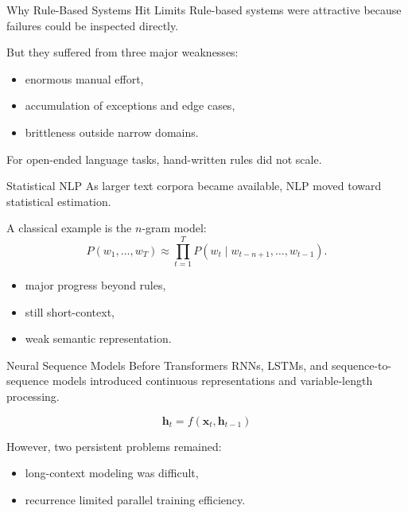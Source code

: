 \documentclass[12pt]{beamer}
\begin{document}
\begin{frame}{Why Rule-Based Systems Hit Limits}
  Rule-based systems were attractive because failures could be inspected directly.

  But they suffered from three major weaknesses:
  \begin{itemize}
    \item enormous manual effort,
    \item accumulation of exceptions and edge cases,
    \item brittleness outside narrow domains.
  \end{itemize}

  For open-ended language tasks, hand-written rules did not scale.
\end{frame}

\begin{frame}{Statistical NLP}
  As larger text corpora became available, NLP moved toward statistical estimation.

  A classical example is the $n$-gram model:
  \[
    P(w_1,\dots,w_T) \approx \prod_{t=1}^T P(w_t\mid w_{t-n+1},\dots,w_{t-1}).
  \]

  \begin{itemize}
    \item major progress beyond rules,
    \item still short-context,
    \item weak semantic representation.
  \end{itemize}
\end{frame}

\begin{frame}{Neural Sequence Models Before Transformers}
  RNNs, LSTMs, and sequence-to-sequence models introduced continuous representations and variable-length processing.

  \[
    \mathbf{h}_t = f(\mathbf{x}_t,\mathbf{h}_{t-1})
  \]

  However, two persistent problems remained:
  \begin{itemize}
    \item long-context modeling was difficult,
    \item recurrence limited parallel training efficiency.
  \end{itemize}
\end{frame}
\end{document}
